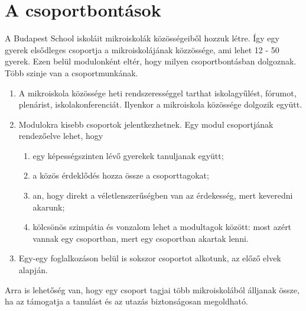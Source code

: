 \section{A csoportbontások}
\label{sec:csoportok}

A Budapest School iskoláit mikroiskolák közösségeiből hozzuk létre. Így
egy gyerek elsődleges csoportja a mikroiskolájának közzössége, ami lehet
12 - 50 gyerek. Ezen belül modulonként eltér, hogy milyen
csoportbontásban dolgoznak. Több szinje van a csoportmunkának.
\begin{enumerate}
      \item A mikroiskola közössége heti rendszerességgel tarthat
            iskolagyűlést,
            fórumot, plenárist, iskolakonferenciát. Ilyenkor a mikroiskola
            közössége
            dolgozik együtt.
      \item  Modulokra kisebb csoportok jelentkezhetnek. Egy modul
            csoportjának rendezőelve lehet, hogy
            \begin{enumerate}
                  \item egy képességszinten lévő gyerekek tanuljanak együtt;
                  \item a közös érdeklődés hozza össze a
                        csoporttagokat;
                  \item an, hogy direkt a véletlenszerűségben van az
                        érdekesség, mert keveredni akarunk;
                  \item kölcsönös szimpátia és vonzalom
                        lehet a modultagok között: most azért vannak egy
                        csoportban,
                        mert egy
                        csoportban akartak lenni.
            \end{enumerate}
      \item  Egy-egy foglalkozáson belül is sokszor
            csoportot alkotunk, az előző elvek alapján.

\end{enumerate}

Arra is lehetőség van, hogy egy csoport tagjai több mikroiskolából álljanak
össze, ha az támogatja a tanulást és az utazás biztonságosan megoldható.
